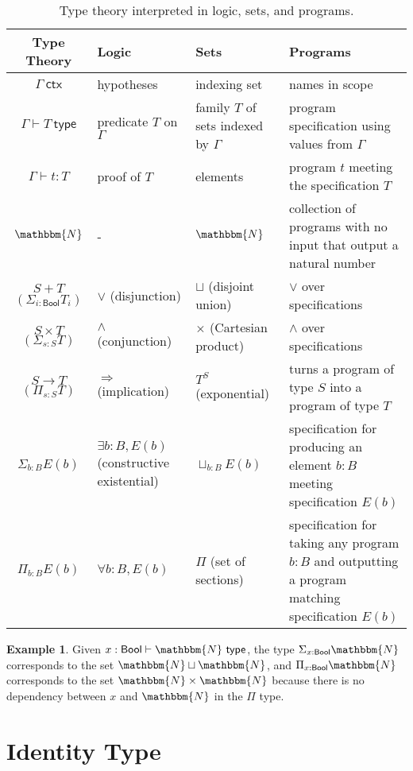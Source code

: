 \documentclass{amsart}
\theoremstyle{definition}
\newtheorem{eg}{Example}[section]
\newcommand{\N}{\mathbbm{N}}
\newcommand{\ctx}{\ensuremath{\mathsf{~ctx}}}
\newcommand{\type}{\ensuremath{\mathsf{~type}}}
\newcommand{\Bool}{\ensuremath{\mathsf{Bool}}}
\begin{document}
\begin{table}[h]
    \centering
    \begin{tabular}{|c||p{}|p{}|p{}|}\hline
        Type Theory & Logic & Sets & Programs \\\hline
        $\Gamma \ctx$ & hypotheses & indexing set & names in scope \\\hline
        $\Gamma \vdash T \type$ & predicate $T$ on $\Gamma$ & family $T$ of sets indexed by $\Gamma$ & program specification using values from $\Gamma$\\\hline
        $\Gamma \vdash t : T$ & proof of $T$ & elements & program $t$ meeting the specification $T$\\\hline
        $\N$ & - & $\N$ & collection of programs with no input that output a natural number \\\hline
        $S + T$  $(\Sigma_{i : \Bool} T_i)$ & $\vee$ (disjunction) & $\sqcup$ (disjoint union) & $\vee$ over specifications \\\hline
        $S \times T$  $(\Sigma_{s : S} T)$ & $\wedge$ (conjunction) & $\times$ (Cartesian product) & $\wedge$ over specifications \\\hline
        $S \rightarrow T$  $(\Pi_{s : S} T)$ & $\Rightarrow$ (implication) & $T^S$ (exponential) & turns a program of type $S$ into a program of type $T$ \\\hline
        $\Sigma_{b : B} E(b)$ & $\exists b:B, E(b)$ (constructive existential) & $\sqcup_{b : B}E(b)$ & specification for producing an element $b : B$ meeting specification $E(b)$ \\\hline
        $\Pi_{b : B} E(b)$ & $\forall b : B, E(b)$ & $\Pi$ (set of sections) & specification for taking any program $b : B$ and outputting a program matching specification $E(b)$ \\\hline
    \end{tabular}
    \caption{Type theory interpreted in logic, sets, and programs.}
    \label{tb:types-as-logic-sets-programs}
\end{table}

\begin{eg}
    Given $x : \Bool \vdash \N \type$, the type $\Sigma_{x : \Bool} \N$ corresponds to the set $\N \sqcup \N$, and $\Pi_{x : \Bool} \N$ corresponds to the set $\N \times \N$ because there is no dependency between $x$ and $\N$ in the $\Pi$ type.
\end{eg}

\section{Identity Type}
\end{document}
